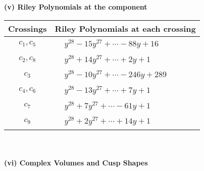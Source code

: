 \documentclass[1p]{elsarticle_modified}
\theoremstyle{definition}
\begin{document}
\newpage\renewcommand{\arraystretch}{1}
\flushleft \textbf{(v) Riley Polynomials at the component}\newline \\
\begin{tabular}{m{50pt}|m{274pt}}
Crossings & \hspace{64pt}Riley Polynomials at each crossing \\
\hline $$\begin{aligned}c_{1},c_{5}\end{aligned}$$&$\begin{aligned}
&y^{28}-15 y^{27}+\cdots-88 y+16
\end{aligned}$\\
\hline $$\begin{aligned}c_{2},c_{8}\end{aligned}$$&$\begin{aligned}
&y^{28}+14 y^{27}+\cdots+2 y+1
\end{aligned}$\\
\hline $$\begin{aligned}c_{3}\end{aligned}$$&$\begin{aligned}
&y^{28}-10 y^{27}+\cdots-246 y+289
\end{aligned}$\\
\hline $$\begin{aligned}c_{4},c_{6}\end{aligned}$$&$\begin{aligned}
&y^{28}-13 y^{27}+\cdots+7 y+1
\end{aligned}$\\
\hline $$\begin{aligned}c_{7}\end{aligned}$$&$\begin{aligned}
&y^{28}+7 y^{27}+\cdots-61 y+1
\end{aligned}$\\
\hline $$\begin{aligned}c_{9}\end{aligned}$$&$\begin{aligned}
&y^{28}+2 y^{27}+\cdots+14 y+1
\end{aligned}$\\
\hline
\end{tabular}\\~\\
\newpage\flushleft \textbf{(vi) Complex Volumes and Cusp Shapes}
\end{document}
